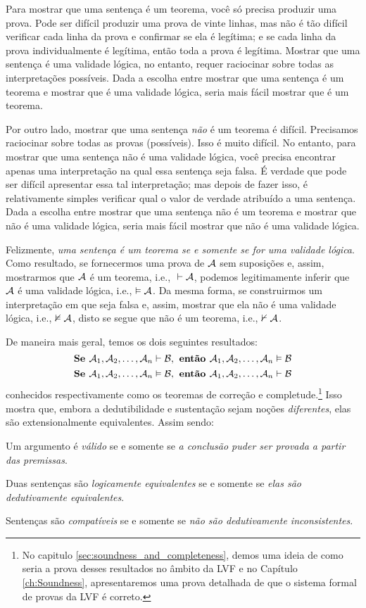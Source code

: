 Para mostrar que uma sentença é um teorema, você só precisa produzir uma prova. Pode ser difícil produzir uma prova de vinte linhas, mas não é tão difícil verificar cada linha da prova e confirmar se ela é legítima; e se cada linha da prova individualmente é legítima, então toda a prova é legítima. Mostrar que uma sentença é uma validade lógica, no entanto, requer raciocinar sobre todas as interpretações possíveis. Dada a escolha entre mostrar que uma sentença é um teorema e mostrar que é uma validade lógica, seria mais fácil mostrar que é um teorema.

Por outro lado, mostrar que uma sentença \emph{não} é um teorema é difícil. Precisamos raciocinar sobre todas as provas (possíveis). Isso é muito difícil. No entanto, para mostrar que uma sentença não é uma validade lógica, você precisa encontrar apenas uma interpretação na qual essa sentença seja falsa. É verdade que pode ser difícil apresentar essa tal interpretação; mas depois de fazer isso, é relativamente simples verificar qual o valor de verdade atribuído a uma sentença. Dada a escolha entre mostrar que uma sentença não é um teorema e mostrar que não é uma validade lógica, seria mais fácil mostrar que não é uma validade lógica.

Felizmente, \emph{uma sentença é um teorema se e somente se for uma validade lógica}. Como resultado, se fornecermos uma prova de $\mathcal{A}$ sem suposições e, assim, mostrarmos que $\mathcal{A}$ é um teorema, i.e., ${}\vdash \mathcal{A}$, podemos legitimamente inferir que $\mathcal{A}$ é uma validade lógica, i.e., $\vDash\mathcal{A}$. Da mesma forma, se construirmos um interpretação em que  seja falsa e, assim, mostrar que ela não é uma validade lógica, i.e., $\nvDash \mathcal{A}$, disto se segue que  não é um teorema, i.e.,  $\nvdash \mathcal{A}$.

De maneira mais geral, temos os dois seguintes resultados: 
$$\textbf{Se }\mathcal{A}_1, \mathcal{A}_2, \ldots, \mathcal{A}_n \vdash\mathcal{B}, \textbf{ então }\mathcal{A}_1, \mathcal{A}_2, \ldots, \mathcal{A}_n \vDash\mathcal{B}$$
$$\textbf{Se }\mathcal{A}_1, \mathcal{A}_2, \ldots, \mathcal{A}_n \vDash\mathcal{B}, \textbf{ então }\mathcal{A}_1, \mathcal{A}_2, \ldots, \mathcal{A}_n \vdash\mathcal{B} $$
conhecidos respectivamente como os teoremas de correção e completude.\footnote{No capitulo \ref{sec:soundness_and_completeness},  demos uma ideia de como seria a prova desses resultados  no âmbito da LVF  e no Capítulo  \ref{ch:Soundness}, apresentaremos uma prova detalhada de que o sistema formal de provas da LVF é correto.}  Isso mostra que, embora a dedutibilidade e sustentação sejam noções \emph{diferentes}, elas são extensionalmente equivalentes. Assim sendo:
	\begin{ebullet}
		\item Um argumento é \emph{válido} se e somente se \emph{a conclusão puder ser provada a partir das premissas}.
		\item Duas sentenças são \emph{logicamente equivalentes} se e somente se \emph{elas são dedutivamente equivalentes}.
		\item Sentenças são \emph{compatíveis} se e somente se  \emph{não são dedutivamente inconsistentes}.
	\end{ebullet}
 
